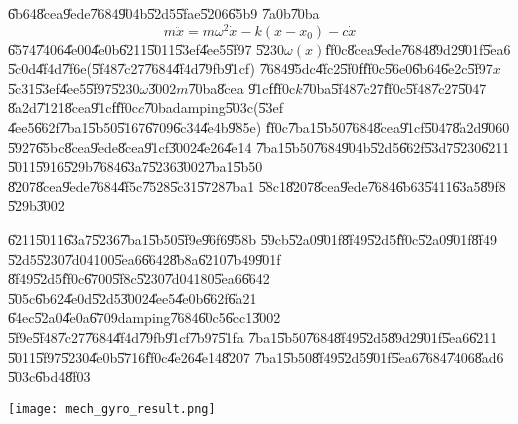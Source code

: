 \U{6b64}\U{8cea}\U{9ede}\U{7684}\U{904b}\U{52d5}\U{5fae}\U{5206}\U{65b9}%
\U{7a0b}\U{70ba}%
\begin{equation*}
m\ddot{x}=m\omega ^{2}\dot{x}-k\left( x-x_{0}\right) -c\dot{x}
\end{equation*}%
\U{6574}\U{7406}\U{4e00}\U{4e0b}\U{6211}\U{5011}\U{53ef}\U{4ee5}\U{5f97}%
\U{5230}$\omega (x)$\U{ff0c}\U{8cea}\U{9ede}\U{7684}\U{89d2}\U{901f}\U{5ea6}%
\U{5c0d}\U{4f4d}\U{7f6e}(\U{5f48}\U{7c27}\U{7684}\U{4f4d}\U{79fb}\U{91cf})%
\U{7684}\U{95dc}\U{4fc2}\U{5f0f}\U{ff0c}\U{56e0}\U{6b64}\U{6e2c}\U{5f97}$x$%
\U{5c31}\U{53ef}\U{4ee5}\U{5f97}\U{5230}$\omega $\U{3002}$m$\U{70ba}\U{8cea}%
\U{91cf}\U{ff0c}$k$\U{70ba}\U{5f48}\U{7c27}\U{ff0c}\U{5f48}\U{7c27}\U{5047}%
\U{8a2d}\U{7121}\U{8cea}\U{91cf}\U{ff0c}$c$\U{70ba}damping\U{503c}(\U{53ef}%
\U{4ee5}\U{662f}\U{7ba1}\U{5b50}\U{5167}\U{6709}\U{6c34}\U{4e4b}\U{985e})%
\U{ff0c}\U{7ba1}\U{5b50}\U{7684}\U{8cea}\U{91cf}\U{5047}\U{8a2d}\U{9060}%
\U{5927}\U{65bc}\U{8cea}\U{9ede}\U{8cea}\U{91cf}\U{3002}\U{4e26}\U{4e14}%
\U{7ba1}\U{5b50}\U{7684}\U{904b}\U{52d5}\U{662f}\U{53d7}\U{5230}\U{6211}%
\U{5011}\U{5916}\U{529b}\U{7684}\U{63a7}\U{5236}\U{3002}\U{7ba1}\U{5b50}%
\U{8207}\U{8cea}\U{9ede}\U{7684}\U{4f5c}\U{7528}\U{5c31}\U{5728}\U{7ba1}%
\U{58c1}\U{8207}\U{8cea}\U{9ede}\U{7684}\U{6b63}\U{5411}\U{63a5}\U{89f8}%
\U{529b}\U{3002}

\U{6211}\U{5011}\U{63a7}\U{5236}\U{7ba1}\U{5b50}\U{5f9e}\U{96f6}\U{958b}%
\U{59cb}\U{52a0}\U{901f}\U{8f49}\U{52d5}\U{ff0c}\U{52a0}\U{901f}\U{8f49}%
\U{52d5}\U{5230}\U{7d04}100\U{5ea6}\U{6642}\U{8b8a}\U{6210}\U{7b49}\U{901f}%
\U{8f49}\U{52d5}\U{ff0c}\U{6700}\U{5f8c}\U{5230}\U{7d04}180\U{5ea6}\U{6642}%
\U{505c}\U{6b62}\U{4e0d}\U{52d5}\U{3002}\U{4ee5}\U{4e0b}\U{662f}\U{6a21}%
\U{64ec}\U{52a0}\U{4e0a}\U{6709}damping\U{7684}\U{60c5}\U{6cc1}\U{3002}%
\U{5f9e}\U{5f48}\U{7c27}\U{7684}\U{4f4d}\U{79fb}\U{91cf}\U{7b97}\U{51fa}%
\U{7ba1}\U{5b50}\U{7684}\U{8f49}\U{52d5}\U{89d2}\U{901f}\U{5ea6}\U{6211}%
\U{5011}\U{5f97}\U{5230}\U{4e0b}\U{5716}\U{ff0c}\U{4e26}\U{4e14}\U{8207}%
\U{7ba1}\U{5b50}\U{8f49}\U{52d5}\U{901f}\U{5ea6}\U{7684}\U{7406}\U{8ad6}%
\U{503c}\U{6bd4}\U{8f03}

\begin{center}
\texttt{[image: mech\_gyro\_result.png]}%
\end{center}

